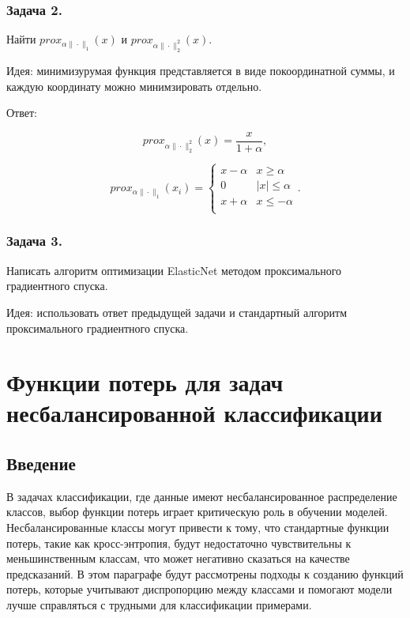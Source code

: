 \subsubsection*{Задача 2.}

Найти $prox_{\alpha\|\cdot\|_1}(x)$ и $prox_{\alpha\|\cdot\|_2^2}(x)$.

Идея: минимизурумая функция представляется в виде покоординатной суммы, и каждую координату можно минимзировать отдельно.

Ответ:

\begin{equation}
    prox_{\alpha\|\cdot\|_2^2}(x)=\frac{x}{1+\alpha},
\end{equation}

\begin{equation}
    prox_{\alpha\|\cdot\|_1}(x_i)=\begin{cases}
        x-\alpha&x\geq\alpha\\
        0&|x|\leq\alpha\\
        x+\alpha&x\leq-\alpha\\
    \end{cases}.
\end{equation}

\subsubsection*{Задача 3.}

Написать алгоритм оптимизации ElasticNet методом проксимального градиентного спуска.

Идея: использовать ответ предыдущей задачи и стандартный алгоритм проксимального градиентного спуска.


\section*{Функции потерь для задач несбалансированной классификации}

\subsection*{Введение}

В задачах классификации, где данные имеют несбалансированное распределение классов, выбор функции потерь играет критическую роль в обучении моделей. Несбалансированные классы могут привести к тому, что стандартные функции потерь, такие как кросс-энтропия, будут недостаточно чувствительны к меньшинственным классам, что может негативно сказаться на качестве предсказаний. В этом параграфе будут рассмотрены подходы к созданию функций потерь, которые учитывают диспропорцию между классами и помогают модели лучше справляться с трудными для классификации примерами.

